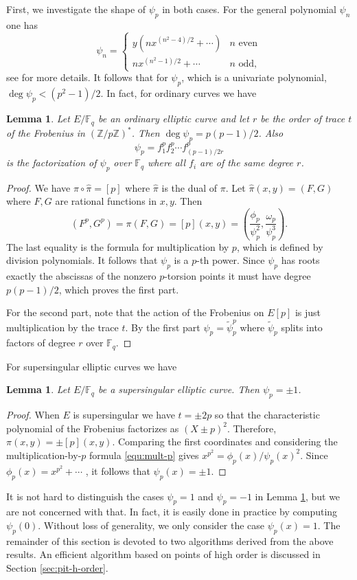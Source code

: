 \documentclass[12pt]{article}
\theoremstyle{plain}
\newtheorem{lemma}[theorem]{Lemma}
\theoremstyle{definition}
\def\Z{\ensuremath{\mathbb{Z}}}
\def\F{\ensuremath{\mathbb{F}}}
\begin{document}
First, we investigate the shape of $\psi_p$ in both cases. For the general polynomial $\psi_n$ one 
has
\[
\psi_n =
\begin{cases}
	y(nx^{(n^2 - 4) / 2} + \cdots) & n \text{ even} \\
	nx^{(n^2 - 1) / 2} + \cdots & n \text{ odd},
\end{cases}
\]
see \cite{washington2008} for more details. It follows that for $\psi_p$, which is a univariate 
polynomial, $\deg \psi_p < (p^2 - 1) / 2$. In fact, for ordinary curves we have
\begin{lemma}
	\label{lem:ord_divpoly}
	Let $E/\F_q$ be an ordinary elliptic curve and let $r$ be the order of trace $t$ of the 
	Frobenius in $(\Z / p\Z)^*$. Then $\deg \psi_p = p(p - 1) / 2$. Also
	\[ \psi_p = f_1^pf_2^p \cdots f_{(p - 1) / 2r}^p \]
	is the factorization of $\psi_p$ over $\F_q$ where all $f_i$ are of the same degree $r$.
\end{lemma}
\begin{proof}
	We have $\pi \circ \hat{\pi} = [p]$ where $\hat{\pi}$ is the dual of $\pi$. Let $\hat{\pi}(x, 
	y) = (F, G)$ where $F, G$ are rational functions in $x, y$. Then
	\begin{equation}
	\label{equ:mult-p}
		(F^p, G^p) = \pi(F, G) = [p](x, y) = \left( \frac{\phi_p}{\psi_p^2}, 		
		\frac{\omega_p}{\psi_p^3} \right).
	\end{equation}
	The last equality is the formula for multiplication by $p$, which is defined by division 
	polynomials. It follows that $\psi_p$ is a $p$-th power. Since $\psi_p$ has roots exactly the 
	abscissas of the nonzero $p$-torsion points it must have degree $p(p - 1) / 2$, which proves 
	the first part.
	
	For the second part, note that the action of the Frobenius on $E[p]$ is just multiplication by 
	the trace $t$. By the first part $\psi_p = \tilde{\psi}_p^p$ where $\tilde{\psi}_p$ splits into 
	factors of degree $r$ over $\F_q$.
\end{proof}
For supersingular elliptic curves we have
\begin{lemma}
	\label{lem:ss_divpoly}
	Let $E/\F_q$ be a supersingular elliptic curve. Then $\psi_p = \pm 1$.
\end{lemma}
\begin{proof}
	When $E$ is supersingular we have $t = \pm 2p$ so that the characteristic polynomial of the 
	Frobenius factorizes as $(X \pm p)^2$. Therefore, $\pi(x, y) = \pm [p](x, y)$. Comparing the 
	first coordinates and considering the multiplication-by-$p$ formula \eqref{equ:mult-p} gives 
	$x^{p^2} = \phi_p(x) / \psi_p(x)^2$. Since $\phi_p(x) = x^{p^2} + \cdots$	
	\cite{washington2008}, it follows that $\psi_p(x) = \pm 1$.
\end{proof}
It is not hard to distinguish the cases $\psi_p = 1$ and $\psi_p = -1$ in Lemma 
\ref{lem:ss_divpoly}, but we are not concerned with that. In fact, it is easily done in practice 
by computing $\psi_p(0)$. Without loss of generality, we only consider the case $\psi_p(x) = 1$. 
The remainder of this section is devoted to two algorithms derived from the above results. An 
efficient algorithm based on points of high order is discussed in Section \ref{sec:pit-h-order}.
\end{document}
